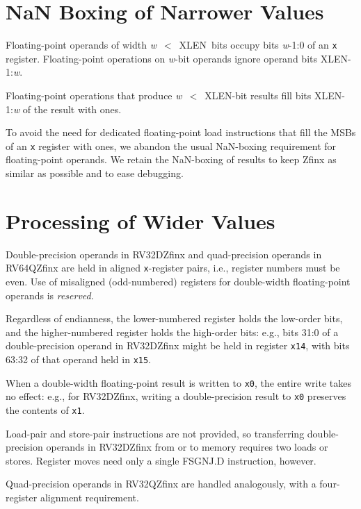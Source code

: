 \section{NaN Boxing of Narrower Values}

Floating-point operands of width \mbox{{\em w} $<$ XLEN bits} occupy bits
\mbox{{\em w}-1:0} of an {\tt x} register.
Floating-point operations on {\em w}-bit operands ignore operand bits
\mbox{XLEN-1:{\em w}}.

Floating-point operations that produce \mbox{{\em w} $<$ XLEN-bit} results
fill bits \mbox{XLEN-1:{\em w}} of the result with ones.

\begin{commentary}
To avoid the need for dedicated floating-point load instructions that fill the
MSBs of an {\tt x} register with ones, we abandon the usual NaN-boxing
requirement for floating-point operands.
We retain the NaN-boxing of results to keep Zfinx as similar as possible and
to ease debugging.
\end{commentary}

\section{Processing of Wider Values}

Double-precision operands in RV32DZfinx and quad-precision operands
in RV64QZfinx are held in aligned {\tt x}-register pairs, i.e.,
register numbers must be even.
Use of misaligned (odd-numbered) registers for double-width floating-point
operands is {\em reserved}.

Regardless of endianness, the lower-numbered register holds the low-order
bits, and the higher-numbered register holds the high-order bits: e.g., bits
31:0 of a double-precision operand in RV32DZfinx might be held in register
{\tt x14}, with bits 63:32 of that operand held in {\tt x15}.

When a double-width floating-point result is written to {\tt x0}, the entire
write takes no effect: e.g., for RV32DZfinx, writing a double-precision result
to {\tt x0} preserves the contents of {\tt x1}.

\begin{commentary}
Load-pair and store-pair instructions are not provided, so transferring
double-precision operands in RV32DZfinx from or to memory requires
two loads or stores.
Register moves need only a single FSGNJ.D instruction, however.
\end{commentary}

Quad-precision operands in RV32QZfinx are handled analogously, with
a four-register alignment requirement.
